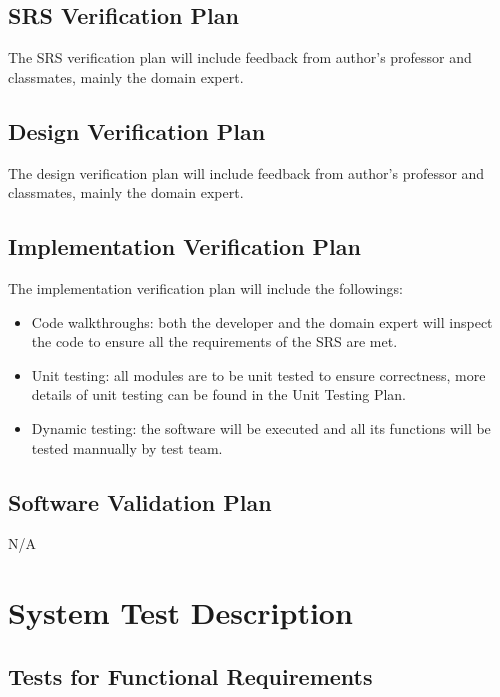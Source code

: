 \documentclass[12pt, titlepage]{article}
\begin{document}
\subsection{SRS Verification Plan}

The SRS verification plan will include feedback from author's professor and
classmates, mainly the domain expert.


\subsection{Design Verification Plan}

The design verification plan will include feedback from author's professor and
classmates, mainly the domain expert.


\subsection{Implementation Verification Plan}

The implementation verification plan will include the followings:
\begin{itemize}
    \item Code walkthroughs: both the developer and the domain expert will
inspect the code to ensure all the requirements of the SRS are met.
    \item Unit testing: all modules are to be unit tested to ensure correctness,
more details of unit testing can be found in the Unit Testing Plan.
    \item Dynamic testing: the software will be executed and all its functions
will be tested mannually by test team.
\end{itemize}


\subsection{Software Validation Plan}

N/A


\section{System Test Description}\label{sec_sysTest}
	
\subsection{Tests for Functional Requirements}
\end{document}
